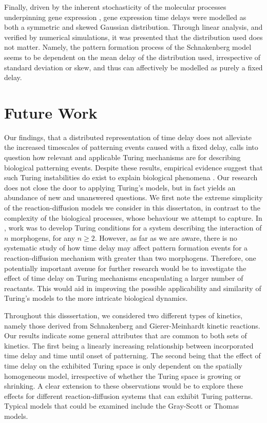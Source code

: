 Finally, driven by the inherent stochasticity of the molecular processes underpinning gene expression \cite{raj,elowitz,mcadams,paulsson}, gene expression time delays were modelled as both a symmetric and skewed Gaussian distribution. Through linear analysis, and verified by numerical simulations, it was presented that the distribution used does not matter. Namely, the pattern formation process of the Schnakenberg model seems to be dependent on the mean delay of the distribution used, irrespective of standard deviation or skew, and thus can affectively be modelled as purely a fixed delay.

\section{Future Work}

Our findings, that a distributed representation of time delay does not alleviate the increased timescales of patterning events caused with a fixed delay, calls into question how relevant and applicable Turing mechanisms are for describing biological patterning events. Despite these results, empirical evidence suggest that such Turing instabilities do exist to explain biological phenomena \cite{yigaffneyli,molecular,miura,miura2,sick}. Our research does not close the door to applying Turing's models, but in fact yields an abundance of new and unanswered questions. We first note the extreme simplicity of the reaction-diffusion models we consider in this dissertaton, in contrast to the complexity of the biological processes, whose behaviour we attempt to capture. In \cite{mainigeneral}, work was  to develop Turing conditions for a system describing the interaction of $n$ morphogens, for any $n\geq2$. However, as far as we are aware, there is no systematic study of how time delay may affect pattern formation events for a reaction-diffusion mechanism with greater than two morphogens. Therefore, one potentially important avenue for further research would be to investigate the effect of time delay on Turing mechanisms encapsulating a larger number of reactants. This would aid in improving the possible applicability and similarity of Turing's models to the more intricate biological dynamics.

Throughout this disssertation, we considered two different types of kinetics, namely those derived from Schnakenberg and Gierer-Meinhardt kinetic reactions. Our results indicate some general attributes that are common to both sets of kinetics. The first being a linearly increasing relationship between incorporated time delay and time until onset of patterning. The second being that the effect of time delay on the exhibited Turing space is only dependent on the spatially homogeneous model, irrespective of whether the Turing space is growing or shrinking. A clear extension to these observations would be to explore these effects for different reaction-diffusion systems that can exhibit Turing patterns. Typical models that could be examined include the Gray-Scott \cite{grayscott} or Thomas \cite{murray} models.

